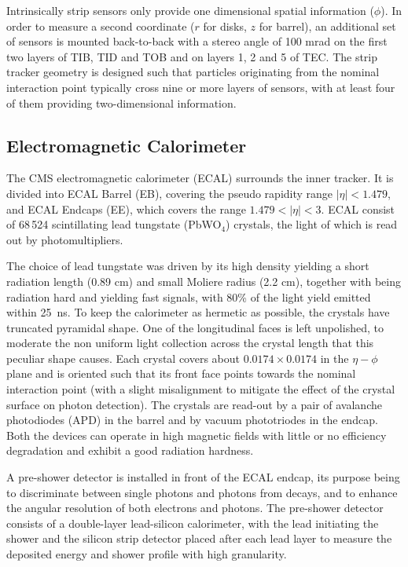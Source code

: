 Intrinsically strip sensors only provide one dimensional spatial information ($\phi$). In order to measure a second coordinate ($r$ for disks, $z$ for barrel), an additional set of sensors is mounted back-to-back with a stereo angle of 100 mrad on the first two layers of TIB, TID and TOB and on layers 1, 2 and 5 of TEC. The strip tracker geometry is designed such that particles originating from the nominal interaction point typically cross nine or more layers of sensors, with at least four of them providing two-dimensional information.


\subsection{Electromagnetic Calorimeter}

The CMS electromagnetic calorimeter (ECAL) surrounds the inner tracker. It is divided into ECAL Barrel (EB), covering the pseudo rapidity range $|\eta| < 1.479$, and ECAL Endcaps (EE), which covers the range $1.479 < |\eta| < 3$. 
ECAL consist of 68\,524 scintillating lead tungstate (PbWO$_4$) crystals, the light of which is read out by photomultipliers. 

The choice of lead tungstate was driven by its high density yielding a short radiation length (0.89 cm) and small Moliere radius (2.2 cm), together with being radiation hard and yielding fast signals, with 80\% of the light yield emitted within 25~ns. To keep the calorimeter as hermetic as possible, the crystals have truncated pyramidal shape. One of the longitudinal faces is left unpolished, to moderate the non uniform light collection across the crystal length that this peculiar shape causes. Each crystal covers about $0.0174 \times 0.0174$ in the $\eta-\phi$ plane and is oriented such that its front face points towards the nominal interaction point (with a slight misalignment to mitigate the effect of the crystal surface on photon detection). The crystals are read-out by a pair of avalanche photodiodes (APD) in the barrel and by vacuum phototriodes in the endcap. Both the devices can operate in high magnetic fields with little or no efficiency degradation and exhibit a good radiation hardness.

A pre-shower detector is installed in front of the ECAL endcap, its purpose being to discriminate between single photons and photons from \piz decays, and to enhance the angular resolution of both electrons and photons. The pre-shower detector consists of a double-layer lead-silicon calorimeter, with the lead initiating the shower and the silicon strip detector placed after each lead layer to measure the deposited energy and shower profile with high granularity.

